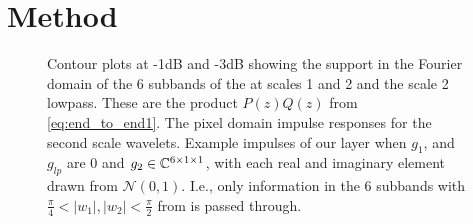 \section{Method}\label{sec:method}
\begin{figure}
  \centering
  \hspace{1cm}
  \newline
  \caption[Contour Plots]{ Contour plots at -1dB and -3dB showing the support in the
    Fourier domain of the 6 subbands of the \DTCWT at scales 1 and 2 and the scale 2 lowpass. These
    are the product $P(z)Q(z)$ from \autoref{eq:end_to_end1}.%
     The pixel domain impulse responses for the second scale
    wavelets.  Example impulses of our layer when $g_1$, and $g_{lp}$ are 0 
    and $g_2 \in \mathbb{C}^{6\times 1\times 1}$, with each real and imaginary element drawn 
    from $\mathcal{N}(0,1)$. I.e., only information in the 6 subbands with $\frac{\pi}{4} < |w_1|,
    |w_2| < \frac{\pi}{2}$ from  is passed through.} 
  \label{fig:dtcwt_bands}
\end{figure}

